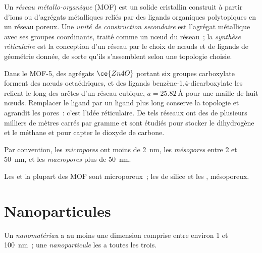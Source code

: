 \begin{definition}\label{def:b3:inorganic-materials:mof}
Un \emph{réseau métallo-organique} (MOF) est un
solide cristallin construit à partir d'ions ou d'agrégats métalliques
reliés par des ligands organiques polytopiques en un réseau poreux. Une
\emph{unité de construction secondaire} est l'agrégat métallique avec
ses groupes coordinants, traité comme un nœud du réseau~; la \emph{synthèse réticulaire}
est la conception d'un réseau par le choix de nœuds et de ligands de
géométrie donnée, de sorte qu'ils s'assemblent selon une topologie choisie.
\end{definition}

Dans le MOF-5, des agrégats $\ce{Zn4O}$ portant six groupes carboxylate forment des nœuds
octaédriques, et des ligands benzène-1,4-dicarboxylate les relient le long
des arêtes d'un réseau cubique, $a = \qty{25.82}{\angstrom}$ pour une maille de huit nœuds. Remplacer le
ligand par un ligand plus long conserve la topologie et agrandit les
pores~: c'est l'idée réticulaire. De tels réseaux ont des  de plusieurs milliers de mètres carrés par gramme et sont
étudiés pour stocker le dihydrogène et le méthane et pour capter le dioxyde
de carbone.

\begin{definition}\label{def:b3:inorganic-materials:pores}
Par convention, les \emph{micropores} ont moins de \qty{2}{nm},
les \emph{mésopores} entre 2 et \qty{50}{nm}, et
les \emph{macropores} plus de \qty{50}{nm}.
\end{definition}

Les  et la plupart des MOF sont microporeux~; les  de silice et les , mésoporeux.

\section{Nanoparticules}

\begin{definition}[Nanomatériaux]\label{def:b3:inorganic-materials:nano}
Un \emph{nanomatériau} a au moins une dimension comprise entre
environ 1 et \qty{100}{nm}~; une \emph{nanoparticule} les a
toutes les trois.
\end{definition}

